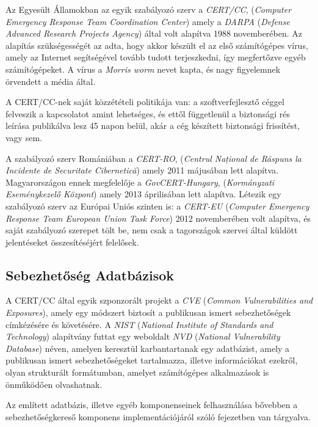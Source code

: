 \documentclass[a4paper,12pt]{article}
\begin{document}
	Az Egyesült Államokban az egyik szabályozó szerv a \textit{CERT/CC}, (\textit{Computer Emergency Response Team Coordination Center}) amely a \textit{DARPA} (\textit{Defense Advanced Research Projects Agency}) által volt alapítva 1988 novemberében. Az alapítás szükségességét az adta, hogy akkor készült el az első számítógépes vírus, amely az Internet segítségével tovább tudott terjeszkedni, így megfertőzve egyéb számítógépeket. A vírus a \textit{Morris worm}\cite{cert15} nevet kapta, és nagy figyelemnek örvendett a média által.
	
	A CERT/CC-nek saját közzétételi politikája van: a szoftverfejlesztő céggel felveszik a kapcsolatot amint lehetséges, és ettől függetlenül a biztonsági rés leírása publikálva lesz 45 napon belül, akár a cég készített biztonsági frissítést, vagy sem.
	
	A szabályozó szerv Romániában a \textit{CERT-RO}, (\textit{Centrul Național de Răspuns la Incidente de Securitate Cibernetică}) amely 2011 májusában lett alapítva\cite{certro12}. Magyarországon ennek megfelelője a \textit{GovCERT-Hungary}, (\textit{Kormányzati Eseménykezelő Központ}) amely 2013 áprilisában lett alapítva\cite{certhu13}. Létezik egy szabályozó szerv az Európai Uniós szinten is: a \textit{CERT-EU} (\textit{Computer Emergency Response Team European Union Task Force}) 2012 novemberében volt alapítva\cite{certeu13}, és saját szabályozó szerepet tölt be, nem csak a tagországok szervei által küldött jelentéseket összesítéséjért felelősek.
	
\subsection{Sebezhetőség Adatbázisok}
	
	A CERT/CC által egyik szponzorált projekt a \textit{CVE} (\textit{Common Vulnerabilities and Exposures}), amely egy módszert biztosít a publikusan ismert sebezhetőségek címkézésére és követésére. A \textit{NIST} (\textit{National Institute of Standards and Technology}) alapítvány futtat egy weboldalt \textit{NVD} (\textit{National Vulnerability Database}) néven, amelyen keresztül karbantartanak egy adatbázist, amely a publikusan ismert sebezhetőségeket tartalmazza, illetve információkat ezekről, olyan strukturált formátumban, amelyet számítógépes alkalmazások is önműködően olvashatnak\cite{nvd15}.
	
	Az említett adatbázis, illetve egyéb komponenseinek felhasználása bővebben a sebezhetőségkereső komponens implementációjáról szóló fejezetben van tárgyalva.
	
\end{document}
